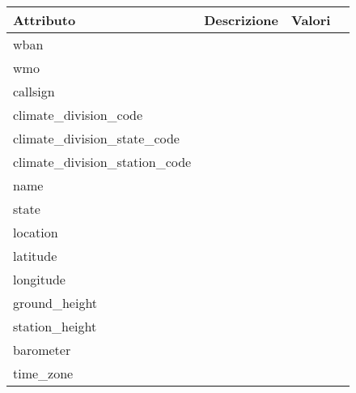 \begin{figure}[H]
	\centering
	\begin{tabular}{lccc}
		\toprule
		\textbf{Attributo} \quad & \textbf{Descrizione} & \textbf{Valori} \\
		\midrule
		wban								&  & 	   		\\	
		wmo									& 	& 		  		\\	
		callsign							& 	 & 		     	\\
		climate\_division\_code				& 	 & 		   		\\	
		climate\_division\_state\_code		& 	 & 		     	\\
		climate\_division\_station\_code	& 	 & 		   		\\	
		name								& 	 & 		     	\\
		state								& 	 & 		    	\\	
		location							& 	 & 		     	\\
		latitude							& 	 & 		    	\\	
		longitude							& 	 & 		    	\\
		ground\_height						& 	 & 		   	 \\		
		station\_height						& 	 & 		     	\\
		barometer							& 	 & 		   		\\	
		time\_zone							& 	 & 		     	\\
		\bottomrule
	\end{tabular}
	\label{tab:attributi stations}
\end{figure}

